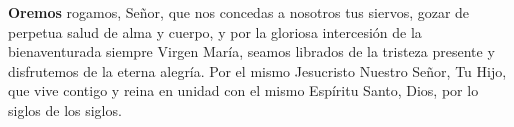 \textbf{Oremos}
 rogamos, Señor, que nos concedas a nosotros tus siervos, gozar de perpetua salud de alma y cuerpo, y por la gloriosa intercesión de la bienaventurada siempre Virgen
María, seamos librados de la tristeza presente y disfrutemos de la eterna alegría. Por el mismo Jesucristo Nuestro Señor, Tu Hijo, que vive contigo y reina en unidad con el mismo Espíritu
Santo, Dios, por lo siglos de los siglos.